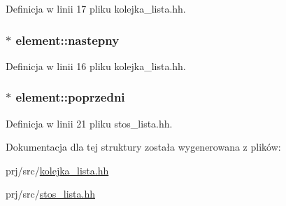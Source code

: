 \-Definicja w linii 17 pliku kolejka\-\_\-lista.\-hh.

\hypertarget{structelement_ab6df52b0e5cfa7c4998a2ab74a8ef53e}{
\subsubsection[{nastepny}]{$\ast$ {\bf element\-::nastepny}}}\label{structelement_ab6df52b0e5cfa7c4998a2ab74a8ef53e}


\-Definicja w linii 16 pliku kolejka\-\_\-lista.\-hh.

\hypertarget{structelement_ab29a484726350416708a843bc30aa4fa}{
\subsubsection[{poprzedni}]{$\ast$ {\bf element\-::poprzedni}}}\label{structelement_ab29a484726350416708a843bc30aa4fa}


\-Definicja w linii 21 pliku stos\-\_\-lista.\-hh.



\-Dokumentacja dla tej struktury została wygenerowana z plików\-:\begin{DoxyCompactItemize}
\item 
prj/src/\hyperlink{kolejka__lista_8hh}{kolejka\-\_\-lista.\-hh}\item 
prj/src/\hyperlink{stos__lista_8hh}{stos\-\_\-lista.\-hh}\end{DoxyCompactItemize}
